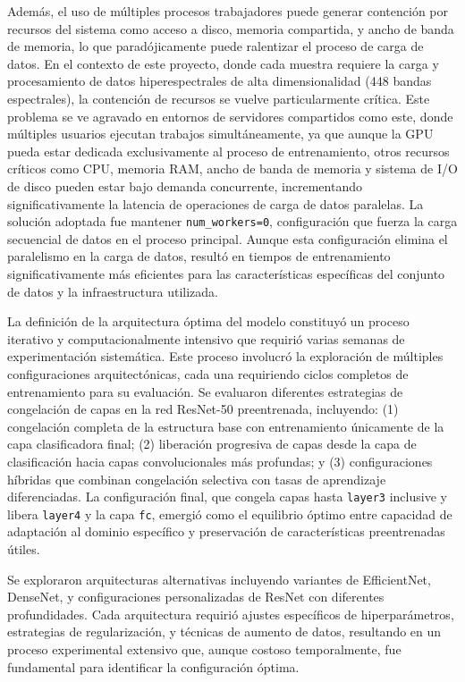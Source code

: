 Además, el uso de múltiples procesos trabajadores puede generar contención por recursos del sistema como acceso a disco, memoria compartida, y ancho de banda de memoria, lo que paradójicamente puede ralentizar el proceso de carga de datos. En el contexto de este proyecto, donde cada muestra requiere la carga y procesamiento de datos hiperespectrales de alta dimensionalidad (448 bandas espectrales), la contención de recursos se vuelve particularmente crítica. Este problema se ve agravado en entornos de servidores compartidos como este, donde múltiples usuarios ejecutan trabajos simultáneamente, ya que aunque la GPU pueda estar dedicada exclusivamente al proceso de entrenamiento, otros recursos críticos como CPU, memoria RAM, ancho de banda de memoria y sistema de I/O de disco pueden estar bajo demanda concurrente, incrementando significativamente la latencia de operaciones de carga de datos paralelas. La solución adoptada fue mantener \texttt{num\_workers=0}, configuración que fuerza la carga secuencial de datos en el proceso principal. Aunque esta configuración elimina el paralelismo en la carga de datos, resultó en tiempos de entrenamiento significativamente más eficientes para las características específicas del conjunto de datos y la infraestructura utilizada.

\vspace{5mm}

La definición de la arquitectura óptima del modelo constituyó un proceso iterativo y computacionalmente intensivo que requirió varias semanas de experimentación sistemática. Este proceso involucró la exploración de múltiples configuraciones arquitectónicas, cada una requiriendo ciclos completos de entrenamiento para su evaluación. Se evaluaron diferentes estrategias de congelación de capas en la red ResNet-50 preentrenada, incluyendo: (1) congelación completa de la estructura base con entrenamiento únicamente de la capa clasificadora final; (2) liberación progresiva de capas desde la capa de clasificación hacia capas convolucionales más profundas; y (3) configuraciones híbridas que combinan congelación selectiva con tasas de aprendizaje diferenciadas. La configuración final, que congela capas hasta \texttt{layer3} inclusive y libera \texttt{layer4} y la capa \texttt{fc}, emergió como el equilibrio óptimo entre capacidad de adaptación al dominio específico y preservación de características preentrenadas útiles.

\vspace{5mm}

Se exploraron arquitecturas alternativas incluyendo variantes de EfficientNet, DenseNet, y configuraciones personalizadas de ResNet con diferentes profundidades. Cada arquitectura requirió ajustes específicos de hiperparámetros, estrategias de regularización, y técnicas de aumento de datos, resultando en un proceso experimental extensivo que, aunque costoso temporalmente, fue fundamental para identificar la configuración óptima.


